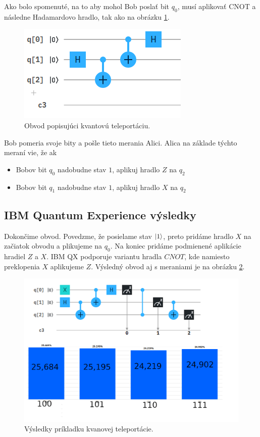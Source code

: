 Ako bolo spomenuté, na to aby mohol Bob poslať bit \(q_0\), musí aplikovať
CNOT a následne Hadamardovo hradlo, tak ako na obrázku \ref{tel_c2}.

\begin{figure}[H]
	\centering 
	\includegraphics[width=.5\textwidth]{figures/tel_c2.png} 
	\caption{Obvod popisujúci kvantovú teleportáciu.}
    \label{tel_c2}
\end{figure}

Bob pomeria svoje bity a pošle tieto merania Alici. Alica na základe týchto
meraní vie, že ak
\begin{itemize}
    \item[] Bobov bit \(q_0\) nadobudne stav \(1\), aplikuj hradlo \(Z\) na 
            \(q_2\)
    \item[] Bobov bit \(q_1\) nadobudne stav \(1\), aplikuj hradlo \(X\) na 
            \(q_2\)
\end{itemize}

\subsection*{IBM Quantum Experience výsledky}
Dokončime obvod. Povedzme, že posielame stav \(\ket{1}\), preto pridáme 
hradlo \(X\) na začiatok obvodu a plikujeme na \(q_0\). Na koniec pridáme 
podmienené aplikácie hradiel \(Z\) a \(X\). IBM QX podporuje variantu hradla
\(CNOT\), kde namiesto preklopenia \(X\) aplikujeme \(Z\). Výsledný obvod aj
s meraniami je na obrázku \ref{tel_qx_results}.

\begin{figure}
	\centering 
	\includegraphics[width=.7\textwidth]{figures/tel_qx_results.png} 
	\caption{Výsledky príkladku kvanovej teleportácie.}
    \label{tel_qx_results}
\end{figure}

